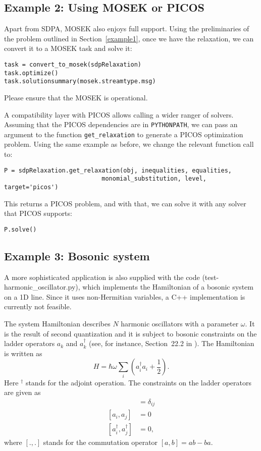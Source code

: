 \documentclass{article}
\begin{document}
\subsection{Example 2: Using MOSEK or PICOS}
Apart from SDPA, MOSEK also enjoys full support. Using the preliminaries of the problem outlined in Section~\ref{example1}, once we have the relaxation, we can convert it to a MOSEK task and solve it:

\begin{verbatim}
task = convert_to_mosek(sdpRelaxation)
task.optimize()
task.solutionsummary(mosek.streamtype.msg)
\end{verbatim}
Please ensure that the MOSEK is operational.

A compatibility layer with PICOS allows calling a wider ranger of solvers. Assuming that the PICOS dependencies are in \verb+PYTHONPATH+, we can pass an argument to the function \verb+get_relaxation+ to generate a PICOS optimization problem. Using the same example as before, we change the relevant function call to:
\begin{verbatim}
P = sdpRelaxation.get_relaxation(obj, inequalities, equalities,
                           monomial_substitution, level, target='picos')
\end{verbatim}
This returns a PICOS problem, and with that, we can solve it with any solver that PICOS supports:
\begin{verbatim}
P.solve()
\end{verbatim}

\subsection{Example 3: Bosonic system}
A more sophisticated application is  also supplied with the code (test-harmonic\_oscillator.py), which implements the Hamiltonian of a bosonic system on a 1D line. Since it uses non-Hermitian variables, a C++ implementation is currently not feasible.

The system Hamiltonian describes $N$ harmonic oscillators with a parameter $\omega$. It is the result of second quantization and it is subject to bosonic constraints on the ladder operators $a_{k}$ and $a_{k}^{\dagger}$ (see, for instance, Section~22.2 in \cite{fayngold2013quantum}). The Hamiltonian is written as
\begin{equation}
  H = \hbar \omega\sum_{i}\left(a_{i}^{\dagger}a_{i}+\frac{1}{2}\right).
\end{equation}
Here $^{\dagger}$ stands for the adjoint operation. The constraints on the ladder operators are given as
\begin{align}
[a_{i},a_{j}^{\dagger}] &=  \delta_{ij} \\
[a_{i},a_{j}]  &=  0 \nonumber \\
[a_{i}^{\dagger},a_{j}^{\dagger}] &=  0,\nonumber
\end{align}
where $[.,.]$ stands for the commutation operator $[a,b]=ab-ba$. 
\end{document}
